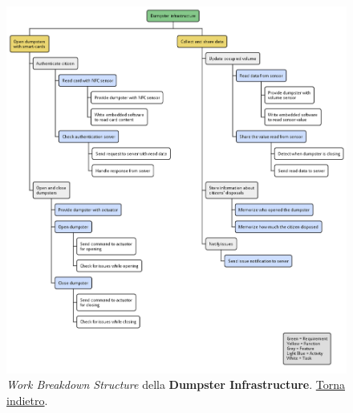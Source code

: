 \begin{figure}[H]
    \centering
    \includegraphics[width=\textwidth]{uml/wbs-dumpster-infrastructure.pm}
    \caption{\textit{Work Breakdown Structure} della \textbf{Dumpster Infrastructure}. \hyperlink{back:uml/wbs-dumpster-infrastructure}{Torna indietro}.}
    \label{fig:uml/wbs-dumpster-infrastructure}
\end{figure}


